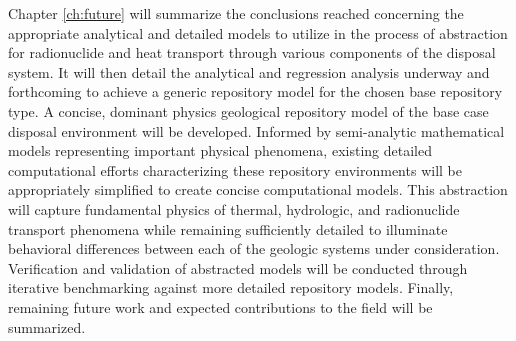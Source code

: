 
Chapter \ref{ch:future} will summarize the conclusions reached concerning the 
appropriate analytical and detailed models to utilize in the process of 
abstraction for radionuclide and heat transport through various components of 
the disposal system. It will then detail the analytical and regression analysis 
underway and forthcoming to achieve a generic repository model for the chosen 
base repository type. A concise, dominant physics geological repository model of 
the base case disposal environment will be developed. Informed by semi-analytic 
mathematical models representing important physical phenomena, existing detailed 
computational efforts characterizing these repository environments will be 
appropriately simplified to create concise computational models. This 
abstraction will capture fundamental physics of thermal, hydrologic, and 
radionuclide transport phenomena while remaining sufficiently detailed to 
illuminate behavioral differences between each of the geologic systems under 
consideration.  Verification and validation of abstracted models will be 
conducted through iterative benchmarking against more detailed repository 
models. Finally, remaining future work and expected contributions to the 
field will be summarized. 


% 

